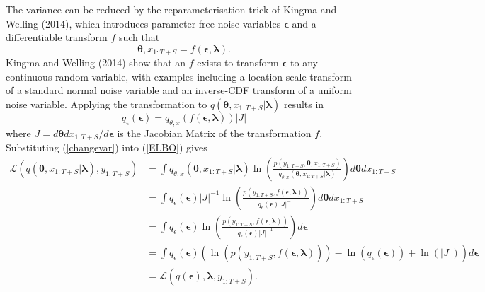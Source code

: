 \documentclass[12pt,a4paper]{article}%
\numberwithin{equation}{section}
\begin{document}
The variance can be reduced by the reparameterisation trick of Kingma and Welling (2014), which introduces parameter free noise variables $\boldsymbol{\epsilon}$ and a differentiable transform $f$ such that
\begin{equation}
\label{Reparam}
\boldsymbol{\theta}, x_{1:T+S} = f(\boldsymbol{\epsilon}, \boldsymbol{\lambda}).
\end{equation}
Kingma and Welling (2014) show that an $f$ exists to transform $\boldsymbol{\epsilon}$ to any continuous random variable, with examples including a location-scale transform of a standard normal noise variable and an inverse-CDF transform of a uniform noise variable. Applying the transformation to $q(\boldsymbol{\theta}, x_{1:T+S} | \boldsymbol{\lambda})$ results in
\begin{equation}
\label{changevar}
q_{\epsilon}(\boldsymbol{\epsilon}) = q_{\theta, x}(f (\boldsymbol{\epsilon}, \boldsymbol{\lambda})) |J|
\end{equation}
where $J = d\boldsymbol{\theta}dx_{1:T+S}/d\boldsymbol{\epsilon}$ is the Jacobian Matrix of the transformation $f$. Substituting (\ref{changevar}) into (\ref{ELBO}) gives
\begin{align}
\mathcal{L}(q(\boldsymbol{\theta}, x_{1:T+S} | \boldsymbol{\lambda}), y_{1:T+S}) &= \int q_{\theta, x}(\boldsymbol{\theta}, x_{1:T+S} | \boldsymbol{\lambda}) \ln \left( \frac{p(y_{1:T+S},\boldsymbol{\theta}, x_{1:T+S})}{q_{\theta, x}(\boldsymbol{\theta}, x_{1:T+S} | \boldsymbol{\lambda})} \right) d\boldsymbol{\theta}dx_{1:T+S} \nonumber \\
&= \int q_{\epsilon}(\boldsymbol{\epsilon})|J|^{-1} \ln \left( \frac{p(y_{1:T+S},f (\boldsymbol{\epsilon}, \boldsymbol{\lambda}))}{q_{\epsilon}(\boldsymbol{\epsilon})|J|^{-1}} \right) d\boldsymbol{\theta}dx_{1:T+S} \nonumber \\
&= \int q_{\epsilon}(\boldsymbol{\epsilon}) \ln \left( \frac{p(y_{1:T+S},f (\boldsymbol{\epsilon}, \boldsymbol{\lambda}))}{q_{\epsilon}(\boldsymbol{\epsilon})|J|^{-1}} \right) d\boldsymbol{\epsilon} \nonumber \\
&= \int q_{\epsilon}(\boldsymbol{\epsilon}) \left( \ln (p(y_{1:T+S},f (\boldsymbol{\epsilon}, \boldsymbol{\lambda}))) - \ln(q_{\epsilon}(\boldsymbol{\epsilon})) + \ln(|J|)\right) d\boldsymbol{\epsilon}\nonumber \\
&= \mathcal{L}(q(\boldsymbol{\epsilon}), \boldsymbol{\lambda}, y_{1:T+S}). \label{reparamELBO}
\end{align}
\end{document}
